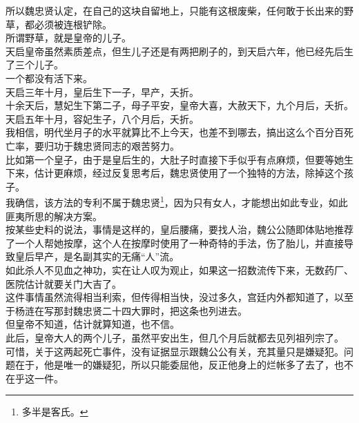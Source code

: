 \begin{multicols}{\theparacolNo}
所以魏忠贤认定，在自己的这块自留地上，只能有这根废柴，任何敢于长出来的野草，都必须被连根铲除。\\

所谓野草，就是皇帝的儿子。\\

天启皇帝虽然素质差点，但生儿子还是有两把刷子的，到天启六年，他已经先后生了三个儿子。\\

一个都没有活下来。\\

天启三年十月，皇后生下一子，早产，夭折。\\

十余天后，慧妃生下第二子，母子平安，皇帝大喜，大赦天下，九个月后，夭折。\\

天启五年十月，容妃生子，八个月后，夭折。\\

我相信，明代坐月子的水平就算比不上今天，也差不到哪去，搞出这么个百分百死亡率，要归功于魏忠贤同志的艰苦努力。\\

比如第一个皇子，由于是皇后生的，大肚子时直接下手似乎有点麻烦，但要等她生下来，估计更麻烦，经过反复思考后，魏忠贤使用了一个独特的方法，除掉这个孩子。\\

我确信，该方法的专利不属于魏忠贤\footnote{多半是客氏。}，因为只有女人，才能想出如此专业，如此匪夷所思的解决方案。\\

按某些史料的说法，事情是这样的，皇后腰痛，要找人治，魏公公随即体贴地推荐了一个人帮她按摩，这个人在按摩时使用了一种奇特的手法，伤了胎儿，并直接导致皇后早产，是名副其实的无痛“人”流。\\

如此杀人不见血之神功，实在让人叹为观止，如果这一招数流传下来，无数药厂、医院估计就要关门大吉了。\\

这件事情虽然流得相当利索，但传得相当快，没过多久，宫廷内外都知道了，以至于杨涟在写那封魏忠贤二十四大罪时，把这条也列进去。\\

但皇帝不知道，估计就算知道，也不信。\\

此后，皇帝大人的两个儿子，虽然平安出生，但几个月后就都去见列祖列宗了。\\

可惜，关于这两起死亡事件，没有证据显示跟魏公公有关，充其量只是嫌疑犯。问题在于，他是唯一的嫌疑犯，所以只能委屈他，反正他身上的烂帐多了去了，也不在乎这一件。\\


\end{multicols}
